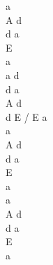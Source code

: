 \documentclass[a5paper, 10pt]{book}
\begin{document}
\begin{minipage}[t]{0.2\textwidth}
a\\
A d\\
d a\\
 E\\
 a\\

a d \\
d a \\
A d \\
d E / E a\\

a\\
A d\\
d a\\
 E\\
 a\\

 a\\
A d\\
d a\\
 E\\
 a\\

\end{minipage}

\newpage
\end{document}
